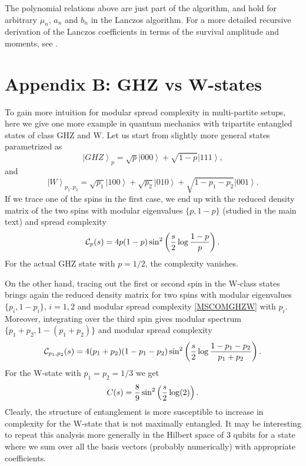 \documentclass[aps,prl,twocolumn,showpacs,preprintnumbers,amsmath,amssymb]{revtex4-1}
\def\frac#1#2{{#1\over #2}}
\def\be{\begin{equation}}
\def\ee{\end{equation}}
\newcommand{\ket}[1]{\left| #1 \right>}
\begin{document}
The polynomial relations above are just part of the algorithm, and hold for arbitrary $\mu_n$, $a_n$ and $b_n$ in the Lanczos algorithm. For a more detailed recursive derivation of the Lanczos coefficients in terms of the survival amplitude and moments, see \cite{Balasubramanian:2022tpr}.

\section{Appendix B: GHZ vs W-states}\label{AppendixB}
To gain more intuition for modular spread complexity in multi-partite setups, here we give one more example in quantum mechanics with tripartite entangled states of class GHZ and W. Let us start from slightly more general states parametrized as
\be
\ket{GHZ}_p=\sqrt{p}\ket{000}+\sqrt{1-p}\ket{111},
\ee
and
\be
\ket{W}_{p_1,p_2}=\sqrt{p_1}\ket{100}+\sqrt{p_2}\ket{010}+\sqrt{1-p_1-p_2}\ket{001}.
\ee
If we trace one of the spins in the first case, we end up with the reduced density matrix of the two spins with modular eigenvalues $\{p,1-p\}$ (studied in the main text) and spread complexity
\be
\mathcal{C}_p(s)=4p(1-p)\sin^2\left(\frac{s}{2}\log\frac{1-p}{p}\right).\label{MSCOMGHZW}
\ee
For the actual GHZ state with $p=1/2$, the complexity vanishes.

On the other hand, tracing out the first or second spin in the W-class states brings again the reduced density matrix for two spins with modular eigenvalues $\{p_i,1-p_i\}$, $i=1,2$ and modular spread complexity \eqref{MSCOMGHZW} with $p_i$. Moreover, integrating over the third spin gives modular spectrum $\{p_1+p_2,1-(p_1+p_2)\}$ and modular spread complexity
\be
\mathcal{C}_{p_1,p_2}(s)=4(p_1+p_2)(1-p_1-p_2)\sin^2\left(\frac{s}{2}\log\frac{1-p_1-p_2}{p_1+p_2}\right).
\ee
For the W-state with $p_1=p_2=1/3$ we get
\be
C(s)=\frac{8}{9}\sin^2\left(\frac{s}{2}\log(2)\right).
\ee
Clearly, the structure of entanglement is more susceptible to increase in complexity for the W-state that is not maximally entangled. It may be interesting to repeat this analysis more generally in the Hilbert space of 3 qubits for a state where we sum over all the basis vectors (probably numerically) with appropriate coefficients. 

\end{document}

